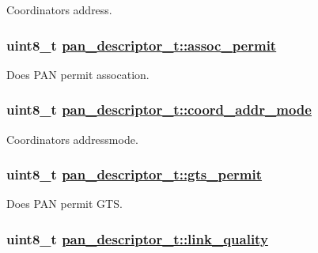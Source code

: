 Coordinators address. \hypertarget{structpan__descriptor__t_eaeabc250f8e65872e96b2b0d7b12061}{
\subsubsection[assoc\_\-permit]{\setlength{\rightskip}{0pt plus 5cm}uint8\_\-t \hyperlink{structpan__descriptor__t_eaeabc250f8e65872e96b2b0d7b12061}{pan\_\-descriptor\_\-t::assoc\_\-permit}}}
\label{structpan__descriptor__t_eaeabc250f8e65872e96b2b0d7b12061}


Does PAN permit assocation. \hypertarget{structpan__descriptor__t_1c8d355ca5d2215605090a65b15c4b76}{
\subsubsection[coord\_\-addr\_\-mode]{\setlength{\rightskip}{0pt plus 5cm}uint8\_\-t \hyperlink{structpan__descriptor__t_1c8d355ca5d2215605090a65b15c4b76}{pan\_\-descriptor\_\-t::coord\_\-addr\_\-mode}}}
\label{structpan__descriptor__t_1c8d355ca5d2215605090a65b15c4b76}


Coordinators addressmode. \hypertarget{structpan__descriptor__t_0947e8dac75a8b36c19aa1c7d1af6e0f}{
\subsubsection[gts\_\-permit]{\setlength{\rightskip}{0pt plus 5cm}uint8\_\-t \hyperlink{structpan__descriptor__t_0947e8dac75a8b36c19aa1c7d1af6e0f}{pan\_\-descriptor\_\-t::gts\_\-permit}}}
\label{structpan__descriptor__t_0947e8dac75a8b36c19aa1c7d1af6e0f}


Does PAN permit GTS. \hypertarget{structpan__descriptor__t_07f083a4298ec06fd86e920ef3eb4a47}{
\subsubsection[link\_\-quality]{\setlength{\rightskip}{0pt plus 5cm}uint8\_\-t \hyperlink{structpan__descriptor__t_07f083a4298ec06fd86e920ef3eb4a47}{pan\_\-descriptor\_\-t::link\_\-quality}}}
\label{structpan__descriptor__t_07f083a4298ec06fd86e920ef3eb4a47}


